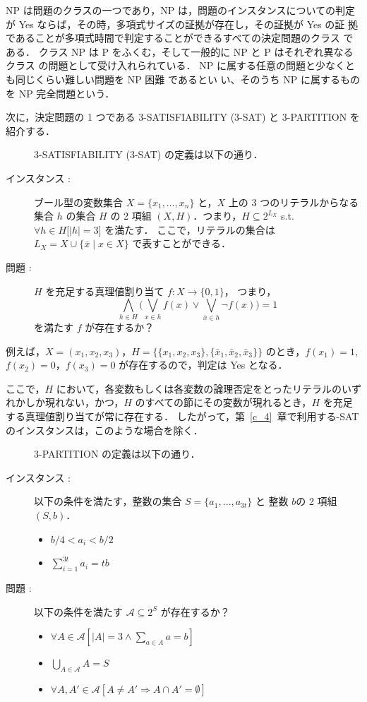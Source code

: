 \documentclass[12pt]{optlab-bachelor}
\begin{document}
NP は問題のクラスの一つであり，NP は，問題のインスタンスについての判定
が Yes ならば，その時，多項式サイズの証拠が存在し，その証拠が Yes の証
拠であることが多項式時間で判定することができるすべての決定問題のクラス
である．
クラス NP は P をふくむ，そして一般的に NP と P はそれぞれ異なるクラス
の問題として受け入れられている．
NP に属する任意の問題と少なくとも同じくらい難しい問題を NP 困難 であるとい
い、そのうち NP に属するものを NP 完全問題という．

次に，決定問題の 1 つである \textsc{\textsc{3-SATISFIABILITY}} (\textsc{3-SAT}) と \textsc{3-PARTITION} を紹介する．

\begin{description}
  \item[] \textsc{\textsc{3-SATISFIABILITY}} (\textsc{3-SAT}) の定義は以下の通り．
  \item[インスタンス : ] ブール型の変数集合 $X = \{x_1,\ldots,x_n\}$ と，$X$ 上の 3 つのリテラルからなる集合 $h$ の集合 $H$ の 2 項組 $(X,H)$．つまり，$H \subseteq 2^{L_X}$ s.t. $\forall h \in H \big[|h| = 3\big]$ を満たす．
  ここで，リテラルの集合は $L_X = X \cup \{\bar x \mid x \in X\}$ で表すことができる．
  \item[問題 : ] $H$ を充足する真理値割り当て $f : X \to \{0,1\}$，
  つまり，
  $$\displaystyle \bigwedge_{h \in H} \bigg(\bigvee_{x \in h}f(x) \lor
  \bigvee_{\bar x \in h}\lnot f(x) \bigg) = 1$$
  を満たす $f$ が存在するか？
\end{description}

例えば，$X = (x_1, x_2, x_3)$，$H = \{\{x_1, x_2,  x_3\}, \{\bar x_1, \bar x_2, \bar x_3\}\}$ のとき，$f(x_1) = 1$, $f(x_2) = 0$，$f(x_3) = 0$ が存在するので，判定は Yes となる．

ここで，$H$ において，各変数もしくは各変数の論理否定をとったリテラルのいずれかしか現れない，かつ，$H$ のすべての節にその変数が現れるとき，$H$ を充足する真理値割り当てが常に存在する．
したがって，第~\ref{c_4}~章で利用する{-SAT} のインスタンスは，このような場合を除く．

\begin{description}
  \item[] \textsc{3-PARTITION} の定義は以下の通り．
  \item[インスタンス : ] 以下の条件を満たす，整数の集合 $S = \{a_1,\ldots,a_{3t}\}$ と 整数 $b$の 2 項組 $(S,b)$．
  \begin{itemize}
    \item $b/4 < a_i < b/2$
    \item $\displaystyle \sum_{i = 1}^{3t}a_i = tb$
  \end{itemize}
  \item[問題 : ] 以下の条件を満たす $\mathcal{A} \subseteq 2^S$ が存在するか？
  \begin{itemize}
    \item $\forall A \in \mathcal{A}[|A| = 3 \land \sum_{a \in A} a = b]$
    \item $\bigcup_{A \in \mathcal{A}} A = S$
    \item $\forall A, A' \in \mathcal{A}[A \neq A' \Rightarrow A \cap A' = \emptyset]$
  \end{itemize}
\end{description}
\end{document}
